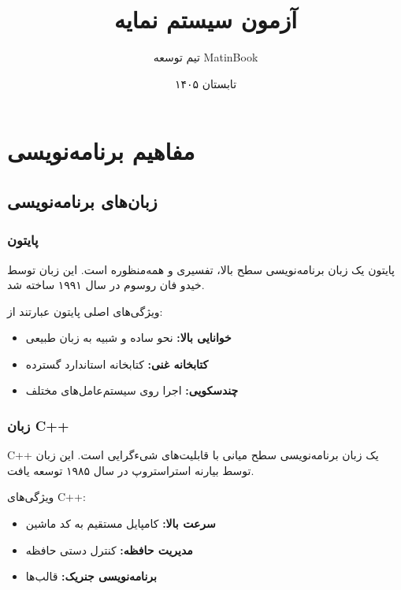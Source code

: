 \documentclass{matinbook}
\title{آزمون سیستم نمایه}
\author{تیم توسعه MatinBook}
\date{تابستان ۱۴۰۵}
\begin{document}
\maketitle

\chapter{مفاهیم برنامه‌نویسی}

\section{زبان‌های برنامه‌نویسی}

\subsection{پایتون}

پایتون یک زبان برنامه‌نویسی
سطح بالا، تفسیری و همه‌منظوره است.
این زبان توسط خیدو فان روسوم
در سال ۱۹۹۱ ساخته شد.

ویژگی‌های اصلی پایتون
عبارتند از:

\begin{itemize}
    \item \textbf{خوانایی بالا:} نحو ساده و شبیه به
    زبان طبیعی
    \item \textbf{کتابخانه غنی:} کتابخانه استاندارد
    گسترده
    \item \textbf{چندسکویی:} اجرا روی سیستم‌عامل‌های
    مختلف
\end{itemize}

\subsection{زبان C++}

C++ یک زبان برنامه‌نویسی
سطح میانی با قابلیت‌های شیءگرایی
است. این زبان توسط بیارنه استراستروپ
در سال ۱۹۸۵ توسعه یافت.

ویژگی‌های C++:

\begin{itemize}
    \item \textbf{سرعت بالا:} کامپایل مستقیم به کد ماشین
    \item \textbf{مدیریت حافظه:} کنترل دستی حافظه
    \item \textbf{برنامه‌نویسی جنریک:} قالب‌ها
\end{itemize}
\end{document}
